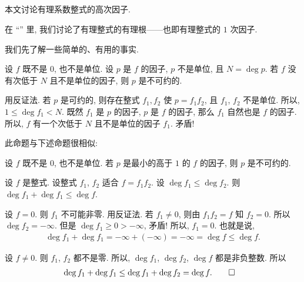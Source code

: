 \subsection*{\FactorsOfHigherDegreeOfPolynomialsOverQ}
\markright{\FactorsOfHigherDegreeOfPolynomialsOverQ}

本文讨论有理系数整式的高次因子.

在 ``\RationalRootsOfPolynomialsOverQ '' 里, 我们讨论了有理整式的有理根——也即有理整式的 $1$ 次因子.

我们先了解一些简单的、有用的事实.

\begin{proposition}
    设 $f$ 既不是 $0$, 也不是单位. 设 $p$ 是 $f$ 的因子, $p$ 不是单位, 且 $N = \deg p$. 若 $f$ 没有次低于 $N$ 且不是单位的因子, 则 $p$ 是不可约的.
\end{proposition}

\begin{pf}
    用反证法. 若 $p$ 是可约的, 则存在整式 $f_1, f_2$ 使 $p = f_1 f_2$, 且 $f_1$, $f_2$ 不是单位. 所以, $1 \leq \deg f_1 < N$. 既然 $f_1$ 是 $p$ 的因子, $p$ 是 $f$ 的因子, 那么 $f_1$ 自然也是 $f$ 的因子. 所以, $f$ 有一个次低于 $N$ 且不是单位的因子 $f_1$. 矛盾!
\end{pf}

\begin{remark}
    此命题与下述命题很相似:

    设 $f$ 既不是 $0$, 也不是单位. 若 $p$ 是最小的高于 $1$ 的 $f$ 的因子, 则 $p$ 是不可约的.
\end{remark}

\begin{proposition}
    设 $f$ 是整式. 设整式 $f_1$, $f_2$ 适合 $f = f_1 f_2$. 设 $\deg f_1 \leq \deg f_2$. 则 $\deg f_1 + \deg f_1 \leq \deg f$.
\end{proposition}

\begin{pf}
    设 $f = 0$. 则 $f_1$ 不可能非零. 用反证法. 若 $f_1 \neq 0$, 则由 $f_1 f_2 = f$ 知 $f_2 = 0$. 所以 $\deg f_2 = -\infty$. 但是 $\deg f_1 \geq 0 > -\infty$, 矛盾! 所以, $f_1 = 0$. 也就是说,
    \begin{align*}
        \deg f_1 + \deg f_1 = -\infty + (-\infty) = -\infty = \deg f \leq \deg f.
    \end{align*}

    设 $f \neq 0$. 则 $f_1$, $f_2$ 都不是零. 所以, $\deg f_1$, $\deg f_2$, $\deg f$ 都是非负整数. 所以
    \begin{align*}
         & \deg f_1 + \deg f_1 \leq \deg f_1 + \deg f_2 = \deg f. \qedhere
    \end{align*}
\end{pf}

